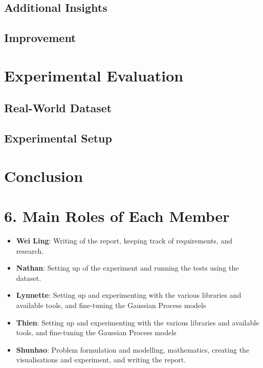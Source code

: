 \documentclass[letterpaper]{article}
\begin{document}
\subsection{Additional Insights}


\subsection{Improvement}



\section{Experimental Evaluation}



\subsection{Real-World Dataset}



\subsection{Experimental Setup}



\section{Conclusion}



\section{6. Main Roles of Each Member}
\begin{itemize}
\item \textbf{Wei Ling}: 
Writing of the report, keeping track of requirements, and research.
\item \textbf{Nathan}: 
Setting up of the experiment and running the tests using the dataset.
\item \textbf{Lynnette}: 
Setting up and experimenting with the various libraries and available tools, and fine-tuning the Gaussian Process models
\item \textbf{Thien}: 
Setting up and experimenting with the various libraries and available tools, and fine-tuning the Gaussian Process models
\item \textbf{Shunhao}: 
Problem formulation and modelling, mathematics, creating the visualisations and experiment, and writing the report.\cite{manning_introduction_2008}
\end{itemize}



\end{document}
